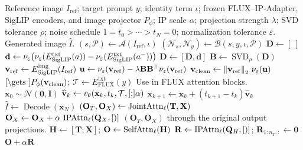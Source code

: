\begin{algorithm}[H]
\caption{VIP-Adapter: semantic projection and gated IP conditioning}
\label{alg:vip-adapter}
\begin{algorithmic}[1]
\Require Reference image $I_{\mathrm{ref}}$; target prompt $y$; identity term $\iota$;
\Statex \hspace{\algorithmicindent} frozen FLUX--IP-Adapter, SigLIP encoders, and image projector $P_{\phi}$;
\Statex \hspace{\algorithmicindent} IP scale $\alpha$; projection strength $\lambda$; SVD tolerance $\rho$;
\Statex \hspace{\algorithmicindent} noise schedule $1=t_0>\cdots>t_N=0$; normalization tolerance $\varepsilon$.
\Ensure Generated image $\widehat I$.
\State $(s,\mathcal P)\gets\mathcal A(I_{\mathrm{ref}},\iota)$ 
\State $(\mathcal N_s,\mathcal N_y)\gets\mathcal B(s,y,\iota,\mathcal P)$ 
\State $\mathbf D\gets[\;]$ 
    \State $\mathbf d\gets\nu_{\varepsilon}\!\left(\nu_{\varepsilon}(E_{\mathrm{SigLIP}}^{\mathrm{txt}}(a))-\nu_{\varepsilon}(E_{\mathrm{SigLIP}}^{\mathrm{txt}}(a^-))\right)$
    \State $\mathbf D\gets[\mathbf D,\mathbf d]$
  \EndFor
\EndFor
\State $\mathbf B\gets\operatorname{SVD}_{\rho}(\mathbf D)$ 
\State $\mathbf v_{\mathrm{ref}}\gets E_{\mathrm{SigLIP}}^{\mathrm{img}}(I_{\mathrm{ref}})$
\State $\mathbf u\gets\nu_{\varepsilon}(\mathbf v_{\mathrm{ref}})-\lambda\mathbf B\mathbf B^{\top}\nu_{\varepsilon}(\mathbf v_{\mathrm{ref}})$
\State $\mathbf v_{\mathrm{clean}}\gets\left\lVert\mathbf v_{\mathrm{ref}}\right\rVert_2\,\nu_{\varepsilon}(\mathbf u)$ 
\State $\Cref\gets P_{\phi}(\vclean)$; $\mathcal T\gets E_{\mathrm{FLUX}}^{\mathrm{txt}}(y)$
\State Use  in FLUX attention blocks.
\State $\mathbf x_0\sim\mathcal N(\mathbf 0,\mathbf I)$
  \State $\widehat{\mathbf v}_k\gets v_{\theta}(\mathbf x_k,t_k,\mathcal T,\Cref;\alpha)$
  \State $\mathbf x_{k+1}\gets\mathbf x_k+(t_{k+1}-t_k)\widehat{\mathbf v}_k$ 
\EndFor
\State \Return $\widehat I\gets\operatorname{Decode}(\mathbf x_N)$
\Statex
{}
    \State $(\mathbf O_T,\mathbf O_X)\gets\operatorname{JointAttn}_{\ell}(\mathbf T,\mathbf X)$
    \State $\mathbf O_X\gets\mathbf O_X+\alpha\,\IPAttn_{\ell}(\mathbf Q_X,\Cref)$
    \State \Return $(\mathbf O_T,\mathbf O_X)$ through the original output projections.
  \Else {}
    \State $\mathbf H\gets[\mathbf T;\mathbf X]$; $\mathbf O\gets\operatorname{SelfAttn}_{\ell}(\mathbf H)$
    \State $\mathbf R\gets\IPAttn_{\ell}(\mathbf Q_H,\Cref)$; $\mathbf R_{1:n_T,:}\gets\mathbf 0$
    \State \Return $\mathbf O+\alpha\mathbf R$
  \EndIf
\EndFunction
\end{algorithmic}
\end{algorithm}

